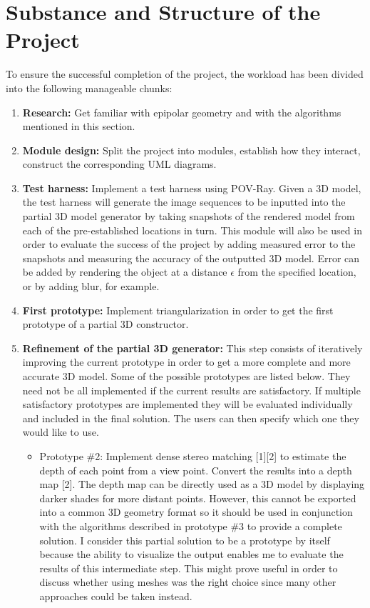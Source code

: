 \section*{Substance and Structure of the Project}
To ensure the successful completion of the project, the workload has been divided into the following manageable chunks:
\begin{enumerate}
\item {\bf Research:} Get familiar with epipolar geometry and with the algorithms mentioned in this section. 
\item {\bf Module design:} Split the project into modules, establish how they interact, construct the corresponding UML diagrams. 
\item {\bf Test harness:} Implement a test harness using POV-Ray. Given a 3D model, the test harness will generate the image sequences to be inputted into the partial 3D model generator by taking snapshots of the rendered model from each of the pre-established locations in turn. This module will also be used in order to evaluate the success of the project by adding measured error to the snapshots and measuring the accuracy of the outputted 3D model. Error can be added by rendering the object at a distance $\epsilon$ from the specified location, or by adding blur, for example.
\item {\bf First prototype:} Implement triangularization in order to get the first prototype of a partial 3D constructor.
\item {\bf Refinement of the partial 3D generator:} This step consists of iteratively improving the current prototype in order to get a more complete and more accurate 3D model. Some of the possible prototypes are listed below. They need not be all implemented if the current results are satisfactory. If multiple satisfactory prototypes are implemented they will be evaluated individually and included in the final solution. The users can then specify which one they would like to use. 
	\begin{itemize}
	\item Prototype \#{2}: Implement dense stereo matching [1][2] to estimate the depth of each point from a view point. Convert the results into a depth map [2]. The depth map can be directly used as a 3D model by displaying darker shades for more distant points. However, this cannot be exported into a common 3D geometry format so it should be used in conjunction with the algorithms described in prototype \#{3} to provide a complete solution. I consider this partial solution to be a prototype by itself because the ability to visualize the output enables me to evaluate the results of this intermediate step. This might prove useful in order to discuss whether using meshes was the right choice since many other approaches could be taken instead.

\end{itemize}
\end{enumerate}
